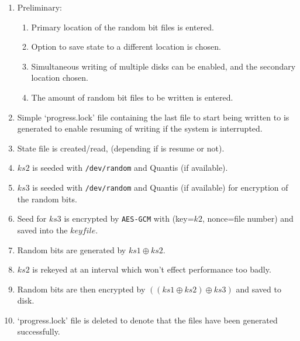 \documentclass{paper}
\begin{document}
				\begin{enumerate}
					\setlength\itemsep{-0.3em}
					\item Preliminary:
					\vspace{-0.75em}
					\begin{enumerate}
						\setlength\itemsep{-0.3em}
						\item Primary location of the random bit files is entered.
						\item Option to save state to a different location is chosen.
						\item Simultaneous writing of multiple disks can be enabled, and the secondary location chosen.
						\item The amount of random bit files to be written is entered.
					\end{enumerate}

					
					\item Simple `progress.lock' file containing the last file to start being written to is generated to enable resuming of writing if the system is interrupted.
					\item State file is created/read, (depending if is resume or not).
					\item $\mathit{ks2}$ is seeded with \texttt{/dev/random} and Quantis (if available).
					\item $\mathit{ks3}$ is seeded with \texttt{/dev/random} and Quantis (if available) for encryption of the random bits.
					\item Seed for $\mathit{ks3}$ is encrypted by \texttt{AES-GCM} with (key=$\mathit{k2}$, nonce=file number) and saved into the $\mathit{keyfile}$.
					\item Random bits are generated by $\mathit{ks1} \oplus \mathit{ks2}$.
					\item $\mathit{ks2}$ is rekeyed at an interval which won't effect performance too badly.
					\item Random bits are then encrypted by $((\mathit{ks1} \oplus \mathit{ks2}) \oplus\mathit{ks3})$ and saved to disk.
					\item `progress.lock' file is deleted to denote that the files have been generated successfully.
				\end{enumerate}
			
\end{document}

